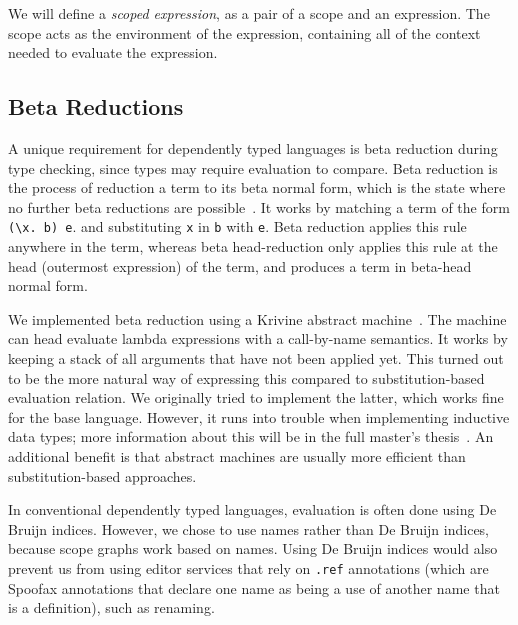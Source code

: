 \documentclass[a4paper,UKenglish,cleveref, autoref, thm-restate]{oasics-v2021}
\begin{document}
We will define a \emph{scoped expression}, as a pair of a scope and an expression. The scope acts as the environment of the expression, containing all of the context needed to evaluate the expression. 

\subsection{Beta Reductions}
\label{sec:coc-dynsyms}

A unique requirement for dependently typed languages is beta reduction during type checking, since types may require evaluation to compare. Beta reduction is the process of reduction a term to its beta normal form, which is the state where no further beta reductions are possible~\cite{tapl}. It works by matching a term of the form \verb|(\x. b) e|. and substituting \verb|x| in \verb|b| with \verb|e|. Beta reduction applies this rule anywhere in the term, whereas beta head-reduction only applies this rule at the head (outermost expression) of the term, and produces a term in beta-head normal form. 

We implemented beta reduction using a Krivine abstract machine~\cite{krivine}. The machine can head evaluate lambda expressions with a call-by-name semantics. It works by keeping a stack of all arguments that have not been applied yet. This turned out to be the more natural way of expressing this compared to substitution-based evaluation relation. We originally tried to implement the latter, which works fine for the base language. However, it runs into trouble when implementing inductive data types; more information about this will be in the full master's thesis~\cite{thesis}. An additional benefit is that abstract machines are usually more efficient than substitution-based approaches.

In conventional dependently typed languages, evaluation is often done using De Bruijn indices. However, we chose to use names rather than De Bruijn indices, because scope graphs work based on names. Using De Bruijn indices would also prevent us from using editor services that rely on \verb|.ref| annotations (which are Spoofax annotations that declare one name as being a use of another name that is a definition), such as renaming.
\end{document}
